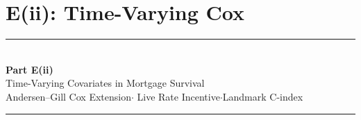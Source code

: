 \documentclass[10pt,aspectratio=169]{beamer}
\begin{document}
\section{E(ii): Time-Varying Cox}

\begin{frame}
    \vfill
    \begin{center}
        {\color{accent}\rule{0.28\linewidth}{1.2pt}}\\[0.7em]
        {\Large\bfseries Part E(ii)}\\[0.5em]
        {\large Time-Varying Covariates in Mortgage Survival}\\[0.4em]
        {\small Andersen--Gill Cox Extension\enspace$\cdot$\enspace
                Live Rate Incentive\enspace$\cdot$\enspace Landmark C-index}\\[0.7em]
        {\color{accent}\rule{0.28\linewidth}{1.2pt}}
    \end{center}
    \vfill
\end{frame}
\end{document}
